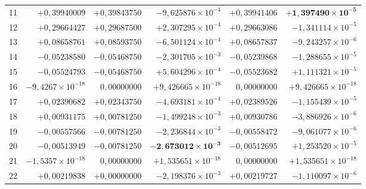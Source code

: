 \documentclass[11pt,a4paper]{article}
\begin{document}
\begin{table}[H]
\begin{adjustbox}{max width=\textwidth}
\begin{tabular}{@{}crrrrr@{}}
        \rowcolor{rowpass}
        11 & $+0,39940009$ & $+0,39843750$ & $-9,625876\times 10^{-4}$ & $+0,39941406$ & $\mathbf{+1,397490\times 10^{-5}}$ \\
        12 & $+0,29664427$ & $+0,29687500$ & $+2,307295\times 10^{-4}$ & $+0,29663086$ & $-1,341114\times 10^{-5}$ \\
        13 & $+0,08658761$ & $+0,08593750$ & $-6,501124\times 10^{-4}$ & $+0,08657837$ & $-9,243257\times 10^{-6}$ \\
        14 & $-0,05238580$ & $-0,05468750$ & $-2,301705\times 10^{-3}$ & $-0,05239868$ & $-1,288655\times 10^{-5}$ \\
        15 & $-0,05524793$ & $-0,05468750$ & $+5,604296\times 10^{-4}$ & $-0,05523682$ & $+1,111321\times 10^{-5}$ \\
        16 & $-9,4267\times 10^{-18}$ & $0,00000000$ & $+9,426665\times 10^{-18}$ & $0,00000000$ & $+9,426665\times 10^{-18}$ \\
        17 & $+0,02390682$ & $+0,02343750$ & $-4,693181\times 10^{-4}$ & $+0,02389526$ & $-1,155439\times 10^{-5}$ \\
        18 & $+0,00931175$ & $+0,00781250$ & $-1,499248\times 10^{-3}$ & $+0,00930786$ & $-3,886926\times 10^{-6}$ \\
        19 & $-0,00557566$ & $-0,00781250$ & $-2,236844\times 10^{-3}$ & $-0,00558472$ & $-9,061077\times 10^{-6}$ \\
        20 & $-0,00513949$ & $-0,00781250$ & $\mathbf{-2,673012\times 10^{-3}}$ & $-0,00512695$ & $+1,253520\times 10^{-5}$ \\
        21 & $-1,5357\times 10^{-18}$ & $0,00000000$ & $+1,535651\times 10^{-18}$ & $0,00000000$ & $+1,535651\times 10^{-18}$ \\
        \rowcolor{rowfail}
        22 & $+0,00219838$ & $+0,00000000$ & $-2,198376\times 10^{-3}$ & $+0,00219727$ & $-1,110097\times 10^{-6}$ \\
        \bottomrule
    \end{tabular}
    \end{adjustbox}
\end{table}
\end{document}
